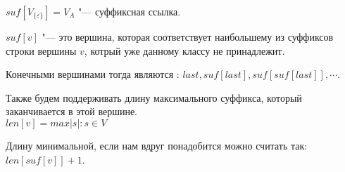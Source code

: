 \begin{description}
    \begin{Def}
    $suf[V_{\{\varepsilon\}}] = V_A$ "--- суффиксная ссылка. 

    $suf[v]$ "--- это вершина, которая соответствует наибольшему из суффиксов строки вершины $v$, котрый 
    уже данному классу не принадлежит.
    \end{Def}

    Конечными вершинами тогда являются : $last, suf[last], suf[suf[last]], \cdots$.

    \begin{Def}
     Также будем поддерживать длину максимального суффикса, который заканчивается в этой вершине.\\
     $len[v] = max|s| \colon s \in V$
    \end{Def}
    
    Длину минимальной, если нам вдруг понадобится можно считать так: $len[suf[v]] + 1$.
    \end{description}
